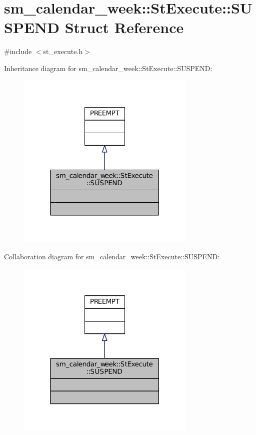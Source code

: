 \hypertarget{structsm__calendar__week_1_1StExecute_1_1SUSPEND}{}\section{sm\+\_\+calendar\+\_\+week\+:\+:St\+Execute\+:\+:S\+U\+S\+P\+E\+ND Struct Reference}
\label{structsm__calendar__week_1_1StExecute_1_1SUSPEND}


{\ttfamily \#include $<$st\+\_\+execute.\+h$>$}



Inheritance diagram for sm\+\_\+calendar\+\_\+week\+:\+:St\+Execute\+:\+:S\+U\+S\+P\+E\+ND\+:
\nopagebreak
\begin{figure}[H]
\begin{center}
\leavevmode
\includegraphics[width=242pt]{structsm__calendar__week_1_1StExecute_1_1SUSPEND__inherit__graph}
\end{center}
\end{figure}


Collaboration diagram for sm\+\_\+calendar\+\_\+week\+:\+:St\+Execute\+:\+:S\+U\+S\+P\+E\+ND\+:
\nopagebreak
\begin{figure}[H]
\begin{center}
\leavevmode
\includegraphics[width=242pt]{structsm__calendar__week_1_1StExecute_1_1SUSPEND__coll__graph}
\end{center}
\end{figure}


